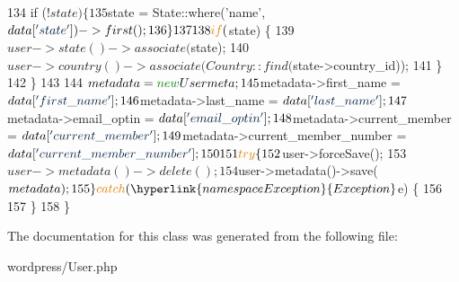 \begin{DoxyCode}
134             \textcolor{keywordflow}{if} (!$state) \{
135                 $state = State::where(\textcolor{stringliteral}{'name'}, $data[\textcolor{stringliteral}{'state'}])->first();
136             \}
137 
138             \textcolor{keywordflow}{if} ($state) \{
139                 $user->state()->associate($state);
140                 $user->country()->associate(Country::find($state->country\_id));
141             \}
142         \}
143 
144         $metadata                           = \textcolor{keyword}{new} Usermeta;
145         $metadata->first\_name               = $data[\textcolor{stringliteral}{'first\_name'}];
146         $metadata->last\_name                = $data[\textcolor{stringliteral}{'last\_name'}];
147         $metadata->email\_optin              = $data[\textcolor{stringliteral}{'email\_optin'}];
148         $metadata->current\_member           = $data[\textcolor{stringliteral}{'current\_member'}];
149         $metadata->current\_member\_number    = $data[\textcolor{stringliteral}{'current\_member\_number'}];
150 
151         \textcolor{keywordflow}{try} \{
152             $user->forceSave();
153             $user->metadata()->delete();
154             $user->metadata()->save($metadata);
155         \} \textcolor{keywordflow}{catch}(\hyperlink{namespaceException}{Exception} $e) \{
156 
157         \}
158     \}
\end{DoxyCode}


The documentation for this class was generated from the following file\+:\begin{DoxyCompactItemize}
\item 
wordpress/User.\+php\end{DoxyCompactItemize}
